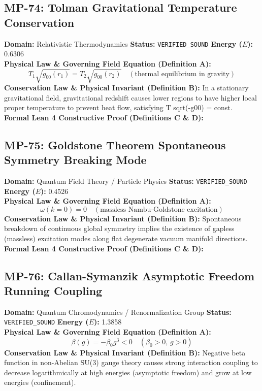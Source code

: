 \subsection{MP-74: Tolman Gravitational Temperature Conservation}
\textbf{Domain:} Relativistic Thermodynamics \hfill \textbf{Status:} \texttt{VERIFIED\_SOUND} \hfill \textbf{Energy ($E$):} 0.6306\\
\textbf{Physical Law \& Governing Field Equation (Definition A):}
\begin{equation*}
T_1 \sqrt{g_{00}(r_1)} = T_2 \sqrt{g_{00}(r_2)} \quad (\text{thermal equilibrium in gravity})
\end{equation*}
\textbf{Conservation Law \& Physical Invariant (Definition B):}
In a stationary gravitational field, gravitational redshift causes lower regions to have higher local proper temperature to prevent heat flow, satisfying T sqrt(-g00) = const.\\

\textbf{Formal Lean 4 Constructive Proof (Definitions C \& D):}


\vspace{1em}
\subsection{MP-75: Goldstone Theorem Spontaneous Symmetry Breaking Mode}
\textbf{Domain:} Quantum Field Theory / Particle Physics \hfill \textbf{Status:} \texttt{VERIFIED\_SOUND} \hfill \textbf{Energy ($E$):} 0.4526\\
\textbf{Physical Law \& Governing Field Equation (Definition A):}
\begin{equation*}
\omega(k=0) = 0 \quad (\text{massless Nambu-Goldstone excitation})
\end{equation*}
\textbf{Conservation Law \& Physical Invariant (Definition B):}
Spontaneous breakdown of continuous global symmetry implies the existence of gapless (massless) excitation modes along flat degenerate vacuum manifold directions.\\

\textbf{Formal Lean 4 Constructive Proof (Definitions C \& D):}


\vspace{1em}
\subsection{MP-76: Callan-Symanzik Asymptotic Freedom Running Coupling}
\textbf{Domain:} Quantum Chromodynamics / Renormalization Group \hfill \textbf{Status:} \texttt{VERIFIED\_SOUND} \hfill \textbf{Energy ($E$):} 1.3858\\
\textbf{Physical Law \& Governing Field Equation (Definition A):}
\begin{equation*}
\beta(g) = -\beta_0 g^3 < 0 \quad (\beta_0 > 0, \, g > 0)
\end{equation*}
\textbf{Conservation Law \& Physical Invariant (Definition B):}
Negative beta function in non-Abelian SU(3) gauge theory causes strong interaction coupling to decrease logarithmically at high energies (asymptotic freedom) and grow at low energies (confinement).\\

